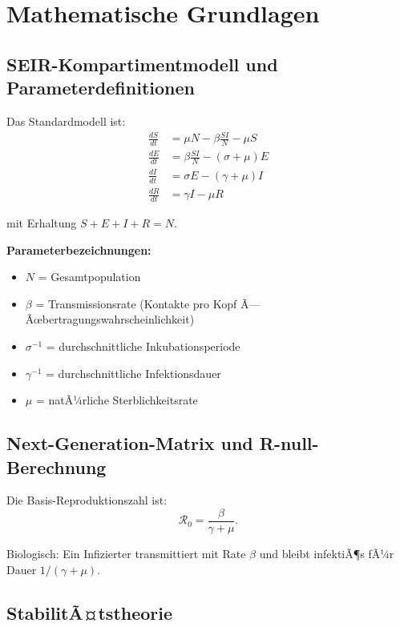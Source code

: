 ﻿\documentclass[a4paper,12pt,twoside]{article}
\theoremstyle{definition}
\begin{document}
\section{Mathematische Grundlagen}
\label{sec:math}

\subsection{SEIR-Kompartimentmodell und Parameterdefinitionen}

Das Standardmodell ist:
\begin{align}
\frac{dS}{dt} &= \mu N - \beta \frac{S I}{N} - \mu S \label{eq:seir_s} \\
\frac{dE}{dt} &= \beta \frac{S I}{N} - (\sigma + \mu) E \label{eq:seir_e} \\
\frac{dI}{dt} &= \sigma E - (\gamma + \mu) I \label{eq:seir_i} \\
\frac{dR}{dt} &= \gamma I - \mu R \label{eq:seir_r}
\end{align}

mit Erhaltung $S + E + I + R = N$.

\textbf{Parameterbezeichnungen:}
\begin{itemize}
\item $N$ = Gesamtpopulation
\item $\beta$ = Transmissionsrate (Kontakte pro Kopf Ã— Ãœbertragungswahrscheinlichkeit)
\item $\sigma^{-1}$ = durchschnittliche Inkubationsperiode
\item $\gamma^{-1}$ = durchschnittliche Infektionsdauer
\item $\mu$ = natÃ¼rliche Sterblichkeitsrate
\end{itemize}

\subsection{Next-Generation-Matrix und R-null-Berechnung}

Die Basis-Reproduktionszahl ist:
\[
\mathcal{R}_0 = \frac{\beta}{\gamma + \mu}.
\]

Biologisch: Ein Infizierter transmittiert mit Rate $\beta$ und bleibt infektiÃ¶s fÃ¼r Dauer $1/(\gamma + \mu)$.

\subsection{StabilitÃ¤tstheorie}
\end{document}
